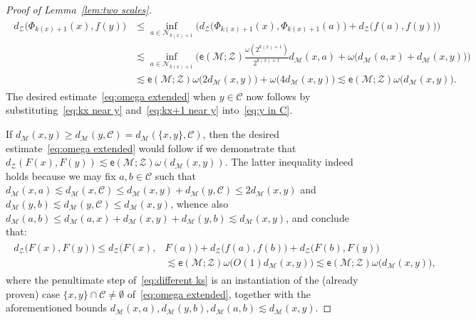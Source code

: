 \documentclass[11pt,reqno]{amsart}
\renewcommand{\le}{\leqslant}
\renewcommand{\ge}{\geqslant}
\newcommand{\ee}{\mathsf{e}}
\newcommand{\cZ}{\mathcal{Z}}
\newcommand{\NN}{\mathcal{N}}
\newcommand{\MM}{\mathcal{M}}
\newcommand{\sub}{\mathscr{C}}
\begin{document}
\begin{proof}[Proof of Lemma~\ref{lem:two scales}]
\begin{align}
\begin{split}\label{eq:kx+1 near y}
d_\cZ\big(\Phi_{k(x)+1}(x),f(y)\big)&\le \inf_{a\in \NN_{k(x)+1}} \Big(d_\cZ\big(\Phi_{k(x)+1}(x),\Phi_{k(x)+1}(a)\big)+d_\cZ\big(f(a),f(y)\big)\Big)\\& \lesssim
\inf_{a\in \NN_{k(x)+1}} \Big(\ee(\MM;\cZ)\frac{\omega(2^{k(x)+1})}{2^{k(x)+1}}d_\MM(x,a)+\omega\big(d_\MM(a,x)+d_\MM(x,y)\big)\Big)\\& \lesssim \ee(\MM;\cZ)\omega\big(2d_\MM(x,y)\big)+\omega\big(4d_\MM(x,y)\big)\lesssim \ee(\MM;\cZ)\omega\big(d_\MM(x,y)\big).
\end{split}
\end{align}
The desired estimate~\eqref{eq:omega extended} when $y\in \sub$ now follows by substituting~\eqref{eq:kx near y} and~\eqref{eq:kx+1 near y} into~\eqref{eq:y in C}. 




If $d_\MM(x,y)\ge d_\MM(y,\sub)=d_\MM(\{x,y\},\sub)$, then the desired estimate~\eqref{eq:omega extended} would follow if we demonstrate that $d_\cZ(F(x),F(y))\lesssim \ee(\MM;\cZ)\omega(d_\MM(x,y))$. The latter inequality  indeed holds because we may fix $a,b\in \sub$ such that $d_\MM(x,a)\lesssim d_\MM(x,\sub)\le d_\MM(x,y)+d_\MM(y,\sub)\le 2d_\MM(x,y)$ and $d_\MM(y,b) \lesssim d_\MM(y,\sub)\le d_\MM(x,y)$, whence also $d_\MM(a,b)\le d_\MM(a,x)+d_\MM(x,y)+d_\MM(y,b)\lesssim d_\MM(x,y)$, and conclude that:
\begin{align}\label{eq:different ks}
\begin{split}
d_{\cZ}\big(F(x),F(y)\big)\le d_{\cZ}\big(F(x),&F(a)\big)+d_{\cZ}\big(f(a),f(b)\big)+d_{\cZ}\big(F(b),F(y)\big)\\&\lesssim \ee(\MM;\cZ)\omega\big(O(1)d_\MM(x,y)\big)\lesssim \ee(\MM;\cZ)\omega\big(d_\MM(x,y)\big),
\end{split}
\end{align}
where the penultimate step of~\eqref{eq:different ks} is an instantiation of the (already proven) case $\{x,y\}\cap \sub\neq\emptyset$ of~\eqref{eq:omega extended}, together with the aforementioned bounds $d_\MM(x,a),d_\MM(y,b),d_\MM(a,b)\lesssim d_\MM(x,y)$.   



\end{proof}
\end{document}

